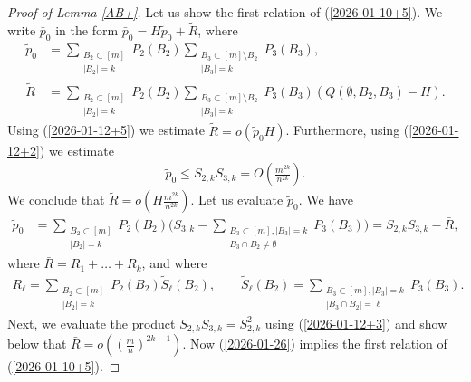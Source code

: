 \documentclass[10pt,a4paper]{amsart}
\begin{document}
\begin{proof}[ Proof of Lemma \ref{AB+}]
Let us show the first relation of (\ref{2026-01-10+5}).
We write ${\bar p}_0$ in the form
${\bar p}_0
=
H{\tilde p}_0+{\tilde R}$,
where
\begin{align*}
{\tilde p}_0
&
=
\sum_{\substack{B_2\subset [m]\\
|B_2|=k}}
P_2(B_2)
\sum_{\substack{B_3\subset [m]\setminus B_2\\
|B_3|=k}}
P_3(B_3),
\\
{\tilde R}
&
=
\sum_{\substack{B_2\subset [m]\\
|B_2|=k}}
P_2(B_2)
\sum_{\substack{B_3\subset [m]\setminus B_2\\
|B_3|=k}}
P_3(B_3) (Q(\emptyset, B_2,B_3)-H).
\end{align*}
Using  (\ref{2026-01-12+5}) we estimate
${\tilde R}=o\left({\tilde p}_0H
\right)$.
Furthermore, using
(\ref{2026-01-12+2}) we estimate
\begin{align*}
{\tilde p}_0
\le 
S_{2,k}S_{3,k}
=
O
\left(\frac{m^{2k}}{n^{2k}}\right).
\end{align*}
We conclude that 
${\tilde R}
=
o\left(H\frac{m^{2k}}{n^{2k}}
\right)$.
Let us evaluate ${\tilde p}_0$.
We have
\begin{align}
\label{2026-01-26}
{\tilde p}_0
&=
\sum_{\substack{B_2\subset [m]\\
|B_2|=k}}
P_2(B_2)
\Biggl(
S_{3,k}
-
\sum_{\substack{B_3\subset [m],|B_3|=k\\
B_3\cap B_2\not=\emptyset}}
P_3(B_3)
\Biggr)
=
S_{2,k}S_{3,k}-{\bar R},
\end{align}
where 
${\bar R}
=
R_1+\dots+R_k$, 
and where
\begin{align*}
R_\ell
=
\sum_{\substack{B_2\subset [m]\\
|B_2|=k}}
P_2(B_2)
{\tilde S}_\ell(B_2),
\qquad
{\tilde S}_\ell(B_2)
=
\sum_{\substack{B_3\subset [m],|B_3|=k\\
|B_3\cap B_2|=\ell}}
P_3(B_3).
\end{align*}
Next, we evaluate the product $S_{2,k}S_{3,k}=S_{2,k}^2$ 
using (\ref{2026-01-12+3}) and show below that
${\bar R}=o
\left(
\left(\frac{m}{n}\right)^{2k-1}
\right)$. Now (\ref{2026-01-26}) implies 
 the first relation of 
(\ref{2026-01-10+5}).







\end{proof}
\end{document}
